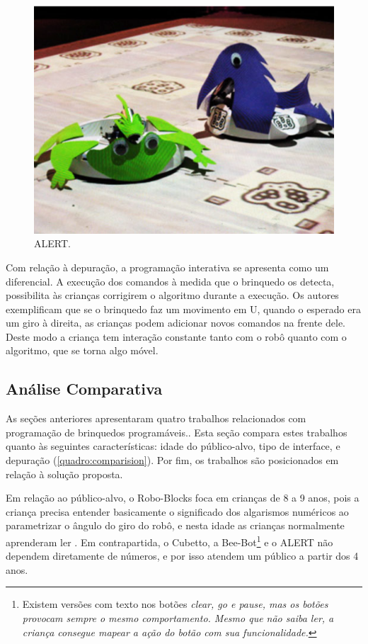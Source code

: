 \begin{figure}[!h]
    \centering
    \includegraphics[width=.6\linewidth,fbox]{figs/alert.png}
    \caption{ALERT.}
    \label{fig:alert}
\end{figure}

Com relação à depuração, a programação interativa se apresenta como um diferencial. A execução dos comandos à medida que o brinquedo os detecta, possibilita às crianças corrigirem o algoritmo durante a execução. Os autores exemplificam que se o brinquedo faz um movimento em U, quando o esperado era um giro à direita, as crianças podem adicionar novos comandos na frente dele. Deste modo a criança tem interação constante tanto com o robô quanto com o algoritmo, que se torna algo móvel.

\subsection{Análise Comparativa}

As seções anteriores apresentaram quatro trabalhos relacionados com programação de brinquedos programáveis.. Esta seção compara estes trabalhos quanto às seguintes características: idade do público-alvo, tipo de interface, e depuração (\autoref{quadro:comparision}). Por fim, os trabalhos são posicionados em relação à solução proposta.

Em relação ao público-alvo, o Robo-Blocks foca em crianças de 8 a 9 anos, pois a criança precisa entender basicamente o significado dos algarismos numéricos ao parametrizar o ângulo do giro do robô, e nesta idade as crianças normalmente aprenderam ler \cite{committee_on_the_prevention_of_reading_difficulties_in_young_children_preventing_1998}. Em contrapartida, o Cubetto, a Bee-Bot\footnote{Existem versões com texto nos botões \it{clear}, \it{go} e \it{pause}, mas os botões provocam sempre o mesmo comportamento. Mesmo que não saiba ler, a criança consegue mapear a ação do botão com sua funcionalidade.} e o ALERT não dependem diretamente de números, e por isso atendem um público a partir dos 4 anos.

